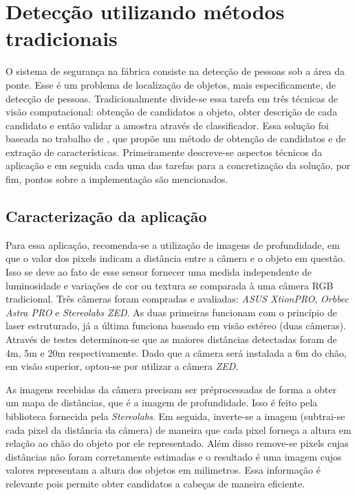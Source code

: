 \chapter{Detecção utilizando métodos tradicionais} \label{chap:tradicional}

O sistema de segurança na fábrica consiste na detecção de pessoas sob a área da ponte. Esse é um problema de localização de objetos, mais especificamente, de detecção de pessoas. Tradicionalmente divide-se essa tarefa em três técnicas de visão computacional: obtenção de candidatos a objeto, obter descrição de cada candidato e então validar a amostra através de classificador. Essa solução foi baseada no trabalho de \cite{rauter}, que propõe um método de obtenção de candidatos e de extração de características. Primeiramente descreve-se aspectos técnicos da aplicação e em seguida cada uma das tarefas para a concretização da solução, por fim, pontos sobre a implementação são mencionados.

\section{Caracterização da aplicação}
Para essa aplicação, recomenda-se a utilização de imagens de profundidade, em que o valor dos pixels indicam a distância entre a câmera e o objeto em questão. Isso se deve ao fato de esse sensor fornecer uma medida independente de luminosidade e variações de cor ou textura se comparada à uma câmera RGB tradicional. Três câmeras foram compradas e avaliadas: \textit{ASUS XtionPRO}, \textit{Orbbec Astra PRO} e \textit{Stereolabs ZED}. As duas primeiras funcionam com o princípio de laser estruturado, já a última funciona baseado em visão estéreo (duas câmeras). Através de testes determinou-se que as maiores distâncias detectadas foram de 4m, 5m e 20m respectivamente. Dado que a câmera será instalada a 6m do chão, em visão superior, optou-se por utilizar a câmera \textit{ZED}.

As imagens recebidas da câmera precisam ser préprocessadas de forma a obter um mapa de distâncias, que é a imagem de profundidade. Isso é feito pela biblioteca fornecida pela \textit{Stereolabs}. Em seguida, inverte-se a imagem (subtrai-se cada pixel da distância da câmera) de maneira que cada pixel forneça a altura em relação ao chão do objeto por ele representado. Além disso remove-se pixels cujas distâncias não foram corretamente estimadas e o resultado é uma imagem cujos valores representam a altura dos objetos em milimetros. Essa informação é relevante pois permite obter candidatos a cabeças de maneira eficiente.

